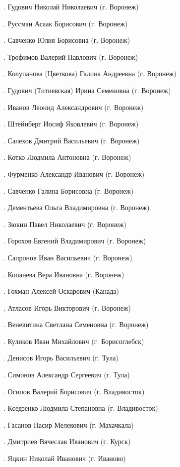 .	Гудович Николай Николаевич (г. Воронеж)

.	Руссман Асаак Борисович (г. Воронеж)

.	Савченко Юлия Борисовна (г. Воронеж)

.	Трофимов Валерий Павлович (г. Воронеж)

.	Колупанова (Цветкова) Галина Андреевна (г. Воронеж)

.	Гудович (Титиевская) Ирина Семеновна (г. Воронеж)

.	Иванов Леонид Александрович (г. Воронеж)

.	Штейнберг Иосиф Яковлевич (г. Воронеж)

.	Салехов Дмитрий Васильевич (г. Воронеж)

.	Котко Людмила Антоновна (г. Воронеж)

.	Фурменко Александр Иванович (г. Воронеж)

.	Савченко Галина Борисовна (г. Воронеж)

.	Дементьева Ольга Владимировна (г. Воронеж)

.	Зюкин Павел Николаевич (г. Воронеж)

.	Горохов Евгений Владимирович (г. Воронеж)

.	Сапронов Иван Васильевич (г. Воронеж)

.	Копанева Вера Ивановна (г. Воронеж)

.	Гохман Алексей Оскарович (Канада)

.	Атласов Игорь Викторович (г. Воронеж)

.	Веневитина Светлана Семеновна (г. Воронеж)

.	Куликов Иван Михайлович (г. Борисоглебск)

.	Денисов Игорь Васильевич (г. Тула)

.	Симонов Александр Сергеевич (г. Тула)

.	Осипов Валерий Борисович (г. Владивосток)

.	Кседзенко Людмила Степановна (г. Владивосток)

.	Гасанов Насир Мелекович (г. Махачкала)

.	Дмитриев Вячеслав Иванович (г. Курск)

.	Яцкин Николай Иванович (г. Иваново)


